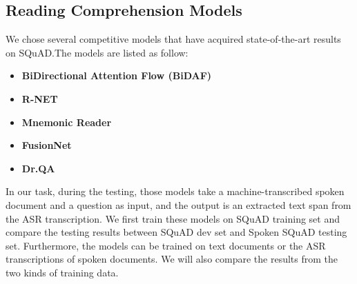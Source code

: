 \documentclass[a4paper]{article}
\begin{document}
\subsection{Reading Comprehension Models}

We chose several competitive models that have acquired state-of-the-art results on SQuAD.The models  are listed as follow:
\begin{itemize}
\item \textbf{BiDirectional Attention Flow (BiDAF)}~\cite{seo2016bidirectional}

\item \textbf{R-NET}~\cite{wang2017gated}
  
\item \textbf{Mnemonic Reader}~\cite{hu2017reinforced}
  \item \textbf{FusionNet}~\cite{huang2017fusionnet}
  \item \textbf{Dr.QA}~\cite{chen2017reading}
  \end{itemize}
In our task, during the testing, those models take a machine-transcribed spoken document and a question as input, and the output is an extracted text span from the ASR transcription. We first train these models on SQuAD training set and compare the testing results between SQuAD dev set and Spoken SQuAD testing set.
Furthermore, the models can be trained on text documents or the ASR transcriptions of spoken documents. 
We will also compare the results from the two kinds of training data.
\end{document}
